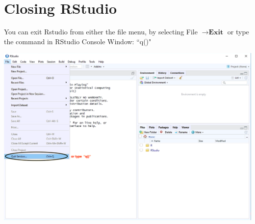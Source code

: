 \documentclass[a4paper]{report}
\begin{document}
   \newpage \section{Closing RStudio}
    
        \begin{flushleft}
            You can exit Rstudio from either the file menu, by selecting File $\longrightarrow \textbf{Exit}$ or type the command in RStudio Console Window: ``q()"
           
         \includegraphics[width=\textwidth]{images/GS3.png}
        \end{flushleft}
        
\end{document}
